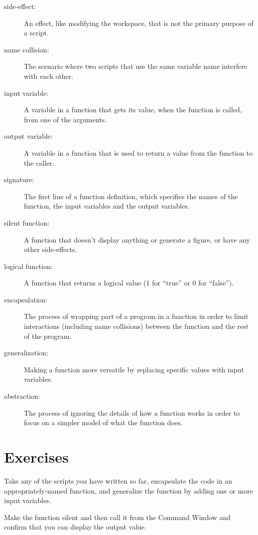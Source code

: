 \documentclass{book}
\begin{document}
\begin{description}

\item[side-effect:] An effect, like modifying the workspace, that
is not the primary purpose of a script.

\item[name collision:] The scenario where two scripts that use the
same variable name interfere with each other.

\item[input variable:] A variable in a function that gets its value,
when the function is called, from one of the arguments.

\item[output variable:] A variable in a function that is used to
return a value from the function to the caller.

\item[signature:] The first line of a function definition, which
specifies the names of the function, the input variables and the
output variables.

\item[silent function:] A function that doesn't display anything
or generate a figure, or have any other side-effects.

\item[logical function:] A function that returns a logical value
(1 for ``true'' or 0 for ``false'').

\item[encapsulation:] The process of wrapping part of a program in
a function in order to limit interactions (including name collisions)
between the function and the rest of the program.

\item[generalization:] Making a function more versatile by replacing
specific values with input variables.

\item[abstraction:] The process of ignoring the details of how
a function works in order to focus on a simpler model of what the
function does.

\end{description}

\section{Exercises}

\begin{ex}
Take any of the scripts you have written so far, encapsulate
the code in an appropriately-named function, and generalize
the function by adding one or more input variables.

Make the function silent and then call it from the Command
Window and confirm that you can display the output value.
\end{ex}
\end{document}
